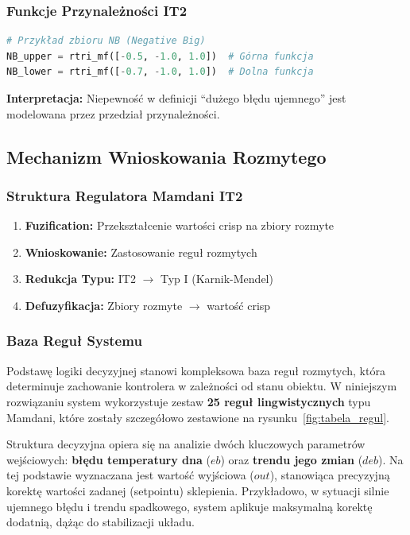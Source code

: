 \documentclass[12pt,a4paper]{article}
\begin{document}
\subsubsection{Funkcje Przynależności IT2}

\begin{lstlisting}[language=Python, caption={Przykład zbioru NB}]
# Przykład zbioru NB (Negative Big)
NB_upper = rtri_mf([-0.5, -1.0, 1.0])  # Górna funkcja
NB_lower = rtri_mf([-0.7, -1.0, 1.0])  # Dolna funkcja
\end{lstlisting}

\textbf{Interpretacja:} Niepewność w definicji ``dużego błędu ujemnego'' jest modelowana przez przedział przynależności.

\subsection{Mechanizm Wnioskowania Rozmytego}

\subsubsection{Struktura Regulatora Mamdani IT2}

\begin{enumerate}
    \item \textbf{Fuzification:} Przekształcenie wartości crisp na zbiory rozmyte
    \item \textbf{Wnioskowanie:} Zastosowanie reguł rozmytych
    \item \textbf{Redukcja Typu:} IT2 $\rightarrow$ Typ I (Karnik-Mendel)
    \item \textbf{Defuzyfikacja:} Zbiory rozmyte $\rightarrow$ wartość crisp
\end{enumerate}

\subsubsection{Baza Reguł Systemu}

Podstawę logiki decyzyjnej stanowi kompleksowa baza reguł rozmytych, która determinuje zachowanie kontrolera w zależności od stanu obiektu. 
W niniejszym rozwiązaniu system wykorzystuje zestaw \textbf{25 reguł lingwistycznych} typu Mamdani, które zostały szczegółowo zestawione na rysunku~\ref{fig:tabela_regul}.

Struktura decyzyjna opiera się na analizie dwóch kluczowych parametrów wejściowych: \textbf{błędu temperatury dna} ($eb$) oraz \textbf{trendu jego zmian} ($deb$). Na tej podstawie wyznaczana jest wartość wyjściowa ($out$), stanowiąca precyzyjną korektę wartości zadanej (setpointu) sklepienia. Przykładowo, w sytuacji silnie ujemnego błędu i trendu spadkowego, system aplikuje maksymalną korektę dodatnią, dążąc do stabilizacji układu.
\end{document}
